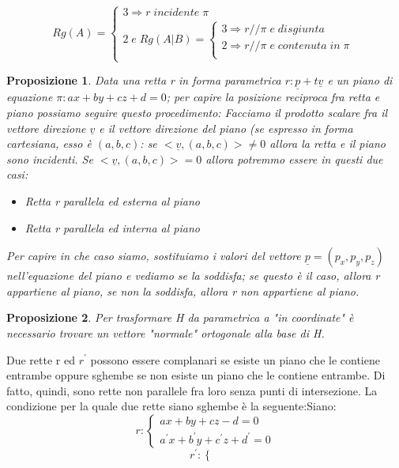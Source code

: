 \documentclass[12pt]{article}
\newenvironment{para}{\begin{adjustwidth}{13mm}{}}{\end{adjustwidth}}
\newtheorem{Proposizione}{Proposizione}[subsection]
\begin{document}
\begin{para}
$$Rg(A) = \begin{cases}
    3 \Rightarrow r \; incidente \; \pi \\
    2 \; e \; Rg(A|B) = \begin{cases}
        3 \Rightarrow r // \pi \; e \; disgiunta \\
        2 \Rightarrow r // \pi \; e \; contenuta \; in \; \pi \\
    \end{cases}
\end{cases}$$
\begin{Proposizione}
    Data una retta r in forma parametrica $r: \underline{p} + t\underline{v}$ e un piano di equazione $\pi: ax+by+cz+d = 0$; per capire la posizione reciproca fra retta e piano possiamo seguire questo procedimento: Facciamo il prodotto scalare fra il vettore direzione $\underline{v}$ e il vettore direzione del piano (se espresso in forma cartesiana, esso è $(a,b,c)$: se $<\underline{v}, (a,b,c)> \neq 0$ allora la retta e il piano sono incidenti. Se $<\underline{v}, (a,b,c)> = 0$ allora potremmo essere in questi due casi: \begin{itemize}
        \item Retta r parallela ed esterna al piano
        \item Retta r parallela ed interna al piano
    \end{itemize}
    Per capire in che caso siamo, sostituiamo i valori del vettore $\underline{p} = (p_x, p_y, p_z)$ nell'equazione del piano e vediamo se la soddisfa; se questo è il caso, allora r appartiene al piano, se non la soddisfa, allora r non appartiene al piano.
\end{Proposizione}
\begin{Proposizione}
    Per trasformare H da parametrica a "in coordinate" è necessario trovare un vettore "normale" ortogonale alla base di H.
\end{Proposizione}
Due rette r ed $r^{'}$ possono essere complanari se esiste un piano che le contiene entrambe oppure sghembe se non esiste un piano che le contiene entrambe. Di fatto, quindi, sono rette non parallele fra loro senza punti di intersezione. La condizione per la quale due rette siano sghembe è la seguente:\newline Siano: $$r: \begin{cases}
    ax+by+cz-d = 0 \\
    a^{'}x+b^{'}y+c^{'}z+d^{'} = 0
\end{cases}$$
$$r^{'}:\begin{cases}

\end{cases}$$
\end{para}
\end{document}
